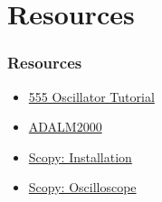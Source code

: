 \documentclass[aspectratio=169]{beamer}
\begin{document}
\section{Resources}
\begin{frame}
  \frametitle{Resources}
  \begin{itemize}
    \item \href{https://www.electronics-tutorials.ws/waveforms/555_oscillator.html}{555 Oscillator Tutorial}
    \item \href{https://www.analog.com/en/design-center/evaluation-hardware-and-software/evaluation-boards-kits/adalm2000.html}{ADALM2000}
    \item \href{https://wiki.analog.com/university/tools/m2k/scopy}{Scopy: Installation}
    \item \href{https://wiki.analog.com/university/tools/m2k/scopy/oscilloscope}{Scopy: Oscilloscope}
  \end{itemize}
\end{frame}
\end{document}
